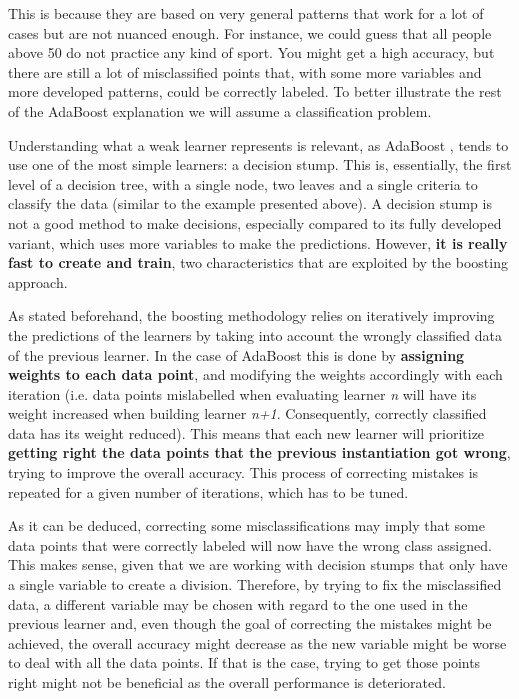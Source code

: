 \documentclass{article}
\begin{document}
This is because they are based on very general patterns that work for a lot of cases but are not nuanced enough. For instance, we could guess that all people above 50 do not practice any kind of sport. You might get a high accuracy, but there are still a lot of misclassified points that, with some more variables and more developed patterns, could be correctly labeled. To better illustrate the rest of the AdaBoost explanation we will assume a classification problem.

Understanding what a weak learner represents is relevant, as AdaBoost \textbf{\cite{Vidhya2}}, \textbf{\cite{youtube}} tends to use one of the most simple learners: a decision stump. This is, essentially, the first level of a decision tree, with a single node, two leaves and a single criteria to classify the data (similar to the example presented above). A decision stump is not a good method to make decisions, especially compared to its fully developed variant, which uses more variables to make the predictions. However, \textbf{it is really fast to create and train}, two characteristics that are exploited by the boosting approach.

As stated beforehand, the boosting methodology relies on iteratively improving the predictions of the learners by taking into account the wrongly classified data of the previous learner. In the case of AdaBoost this is done by \textbf{assigning weights to each data point}, and modifying the weights accordingly with each iteration (i.e. data points mislabelled  when evaluating learner \textit{n} will have its weight increased when building learner \textit{n+1}. Consequently, correctly classified data has its weight reduced). This means that each new learner will prioritize \textbf{getting right the data points that the previous instantiation got wrong}, trying to improve the overall accuracy. This process of correcting mistakes is repeated for a given number of iterations, which has to be tuned.

As it can be deduced, correcting some misclassifications may imply that some data points that were correctly labeled will now have the wrong class assigned. This makes sense, given that we are working with decision stumps that only have a single variable to create a division. Therefore, by trying to fix the misclassified data, a different variable may be chosen with regard to the one used in the previous learner and, even though the goal of correcting the mistakes might be achieved, the overall accuracy might decrease as the new variable might be worse to deal with all the data points. If that is the case, trying to get those points right might not be beneficial as the overall performance is deteriorated.
\end{document}
